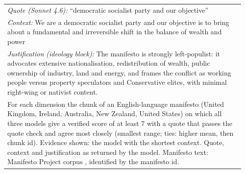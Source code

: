 {\begin{longtable}{p{0.96\linewidth}}
\quad \emph{Quote (Sonnet 4.6):} ``democratic socialist party and our objective'' \\
\quad \emph{Context:} We are a democratic socialist party and our objective is to bring about a fundamental and irreversible shift in the balance of wealth and power \\
\quad \emph{Justification (ideology block):} The manifesto is strongly left-populist: it advocates extensive nationalisation, redistribution of wealth, public ownership of industry, land and energy, and frames the conflict as working people versus property speculators and Conservative elites, with minimal right-wing or nativist content. \\
\bottomrule
\multicolumn{1}{p{0.96\linewidth}}{\scriptsize For each dimension the chunk of an English-language manifesto (United Kingdom, Ireland, Australia, New Zealand, United States) on which all three models give a verified score of at least 7 with a quote that passes the quote check and agree most closely (smallest range; ties: higher mean, then chunk id). Evidence shown: the model with the shortest context. Quote, context and justification as returned by the model. Manifesto text: Manifesto Project corpus \citep{lehmann2026manifesto}, identified by the manifesto id.} \\
\end{longtable}
}
